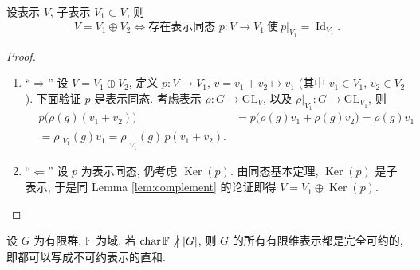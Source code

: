 \begin{lemma}\label{lem:rep-complement}
设表示 $V$, 子表示 $V_1\subset V$, 则
\begin{equation*}
  V=V_1\oplus V_2\iff \text{存在表示同态 } p\colon V\to V_1\ \text{使}\ p|_{V_1}=\operatorname{Id}_{V_1}.
\end{equation*}
\end{lemma}

\begin{proof}
\mbox{}\par\vspace{-0.2em}
\begin{enumerate}
\item ``$\Longrightarrow$'' 设 $V=V_1\oplus V_2$, 定义 $p\colon V\to V_1$, $v=v_1+v_2\mapsto v_1$
(其中 $v_1\in V_1$, $v_2\in V_2$). 下面验证 $p$ 是表示同态.
考虑表示 $\rho\colon G\to\mathrm{GL}_V$, 以及 $\rho|_{V_1}\colon G\to\mathrm{GL}_{V_1}$, 则
\[\begin{aligned}
  &p\bigl(\rho(g)(v_1+v_2)\bigr)
  &=p\bigl(\rho(g)v_1+\rho(g)v_2\bigr)=\rho(g)v_1\\
  &=\rho|_{V_1}(g)v_1=\rho|_{V_1}(g)\,p(v_1+v_2).
\end{aligned}\]
\item ``$\Longleftarrow$'' 设 $p$ 为表示同态, 仍考虑 $\operatorname{Ker}(p)$. 由同态基本定理, $\operatorname{Ker}(p)$ 是子表示,
于是同 Lemma \ref{lem:complement} 的论证即得 $V=V_1\oplus\operatorname{Ker}(p)$.
\end{enumerate}
\end{proof}

\begin{theorem}[Maschke]\label{thm:maschke}
设 $G$ 为有限群, $\mathbb{F}$ 为域, 若 $\operatorname{char}\mathbb{F}\mathrel{\not\big|}|G|$, 则 $G$ 的所有有限维表示都是完全可约的,
即都可以写成不可约表示的直和.
\end{theorem}

